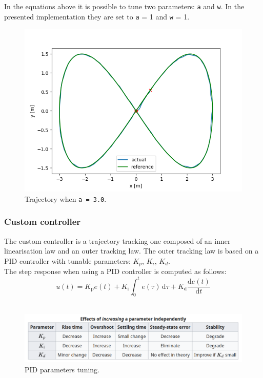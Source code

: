 \documentclass[11pt,a4paper]{article}
\begin{document}
In the equations above it is possible to tune two parameters: \texttt{a} and \texttt{w}.
In the presented implementation they are set to \texttt{a} = 1 and \texttt{w} = 1.

\begin{figure}[H]
    \centering
    \includegraphics[scale=0.6]{different_params/dwa_a3/Trajectory.png}
    \caption{Trajectory when \texttt{a = 3.0}.}
\end{figure}

\subsubsection{Custom controller}

The custom controller is a trajectory tracking one composed of an inner linearisation law and an outer tracking law.
The outer tracking law is based on a PID controller with tunable parameters: $K_p$, $K_i$, $K_d$.\\

The step response when using a PID controller is computed as follows:
$$ {\displaystyle u(t)=K_{\text{p}}e(t)+K_{\text{i}}\int _{0}^{t}e(\tau )\,\mathrm {d} \tau +K_{\text{d}}{\frac {\mathrm {d} e(t)}{\mathrm {d} t}}} $$ \\

\begin{figure}[H]
    \centering
    \includegraphics[scale=0.4]{other/PID_parameters_description.png}
    \caption{PID parameters tuning.}
\end{figure}
\end{document}

